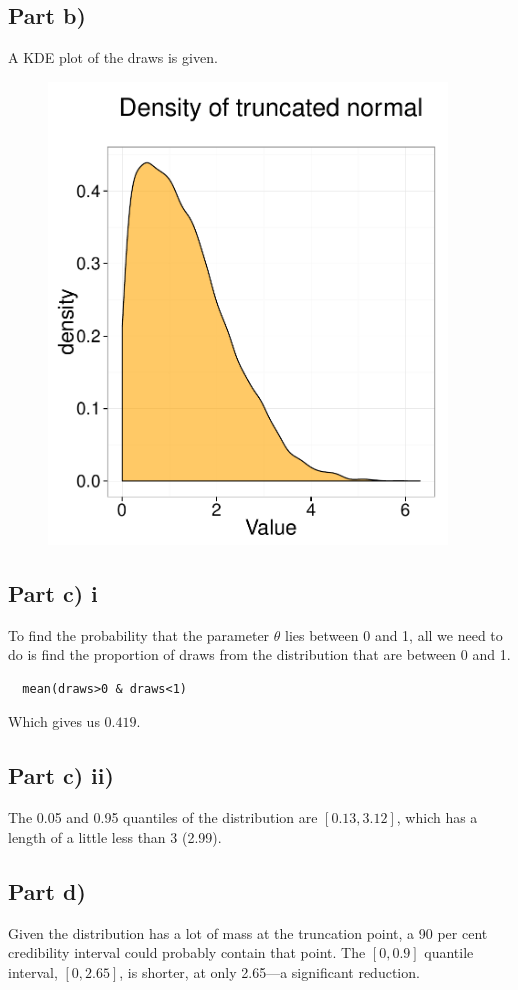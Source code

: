 \documentclass[a4paper,11pt]{article}
\begin{document}
\subsection*{Part b)}

A KDE plot of the draws is given. 

\begin{figure}
  \centering
  \includegraphics[width=300pt]{truncated_density.pdf}\\
  \label{density}
\end{figure}


\subsection*{Part c) i}

To find the probability that the parameter $\theta$ lies between 0 and 1, all we need to do is find the proportion of draws from the distribution that are between 0 and 1.

\begin{verbatim}
  mean(draws>0 & draws<1)
\end{verbatim}

\noindent Which gives us $0.419$.

\subsection*{Part c) ii)}

The 0.05 and 0.95 quantiles of the distribution are $[0.13, 3.12]$, which has a length of a little less than 3 (2.99).

\subsection*{Part d)}

Given the distribution has a lot of mass at the truncation point, a 90 per cent credibility interval could probably contain that point. The $[0, 0.9]$ quantile interval, $[0, 2.65]$, is shorter, at only 2.65---a significant reduction.
\end{document}
